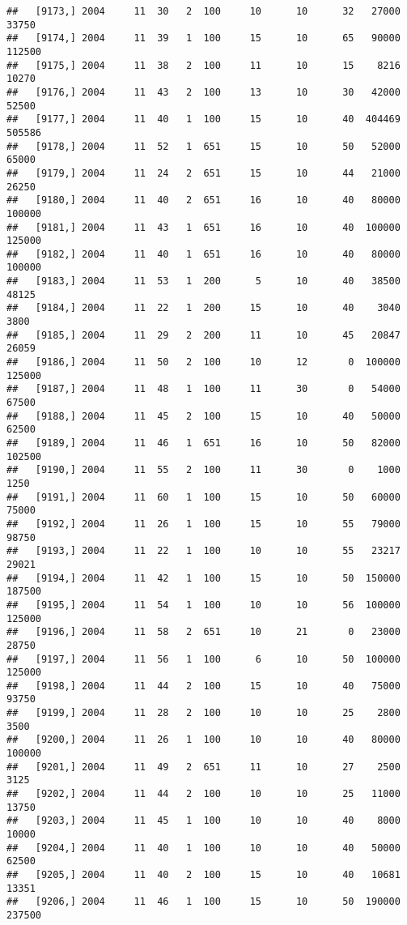 \documentclass{article}\usepackage[]{graphicx}\usepackage[]{color}
\makeatletter
\newenvironment{kframe}{%
 \def\at@end@of@kframe{}%
 \ifinner\ifhmode%
  \def\at@end@of@kframe{\end{minipage}}%
  \begin{minipage}{\columnwidth}%
 \fi\fi%
 \def\FrameCommand##1{\hskip\@totalleftmargin \hskip-\fboxsep
 \colorbox{shadecolor}{##1}\hskip-\fboxsep
     \hskip-\linewidth \hskip-\@totalleftmargin \hskip\columnwidth}%
 \MakeFramed {\advance\hsize-\width
   \@totalleftmargin\z@ \linewidth\hsize
   \@setminipage}}%
 {\par\unskip\endMakeFramed%
 \at@end@of@kframe}
\newenvironment{knitrout}{}{} %
\makeatother
\begin{document}
\begin{knitrout}
\begin{kframe}
\begin{verbatim}
##   [9173,] 2004     11  30   2  100     10      10      32   27000   33750
##   [9174,] 2004     11  39   1  100     15      10      65   90000  112500
##   [9175,] 2004     11  38   2  100     11      10      15    8216   10270
##   [9176,] 2004     11  43   2  100     13      10      30   42000   52500
##   [9177,] 2004     11  40   1  100     15      10      40  404469  505586
##   [9178,] 2004     11  52   1  651     15      10      50   52000   65000
##   [9179,] 2004     11  24   2  651     15      10      44   21000   26250
##   [9180,] 2004     11  40   2  651     16      10      40   80000  100000
##   [9181,] 2004     11  43   1  651     16      10      40  100000  125000
##   [9182,] 2004     11  40   1  651     16      10      40   80000  100000
##   [9183,] 2004     11  53   1  200      5      10      40   38500   48125
##   [9184,] 2004     11  22   1  200     15      10      40    3040    3800
##   [9185,] 2004     11  29   2  200     11      10      45   20847   26059
##   [9186,] 2004     11  50   2  100     10      12       0  100000  125000
##   [9187,] 2004     11  48   1  100     11      30       0   54000   67500
##   [9188,] 2004     11  45   2  100     15      10      40   50000   62500
##   [9189,] 2004     11  46   1  651     16      10      50   82000  102500
##   [9190,] 2004     11  55   2  100     11      30       0    1000    1250
##   [9191,] 2004     11  60   1  100     15      10      50   60000   75000
##   [9192,] 2004     11  26   1  100     15      10      55   79000   98750
##   [9193,] 2004     11  22   1  100     10      10      55   23217   29021
##   [9194,] 2004     11  42   1  100     15      10      50  150000  187500
##   [9195,] 2004     11  54   1  100     10      10      56  100000  125000
##   [9196,] 2004     11  58   2  651     10      21       0   23000   28750
##   [9197,] 2004     11  56   1  100      6      10      50  100000  125000
##   [9198,] 2004     11  44   2  100     15      10      40   75000   93750
##   [9199,] 2004     11  28   2  100     10      10      25    2800    3500
##   [9200,] 2004     11  26   1  100     10      10      40   80000  100000
##   [9201,] 2004     11  49   2  651     11      10      27    2500    3125
##   [9202,] 2004     11  44   2  100     10      10      25   11000   13750
##   [9203,] 2004     11  45   1  100     10      10      40    8000   10000
##   [9204,] 2004     11  40   1  100     10      10      40   50000   62500
##   [9205,] 2004     11  40   2  100     15      10      40   10681   13351
##   [9206,] 2004     11  46   1  100     15      10      50  190000  237500

\end{verbatim}
\end{kframe}
\end{knitrout}
\end{document}
